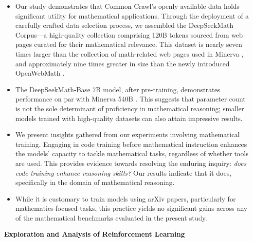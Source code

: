 \begin{itemize}[topsep=0pt]
    \item Our study demonstrates that Common Crawl's openly available data holds significant utility for mathematical applications. Through the deployment of a carefully crafted data selection process, we assembled the DeepSeekMath Corpus—a high-quality collection comprising 120B tokens sourced from web pages curated for their mathematical relevance. This dataset is nearly seven times larger than the collection of math-related web pages used in Minerva \citep{minerva}, and approximately nine times greater in size than the newly introduced OpenWebMath \citep{openwebmath}.

\item The DeepSeekMath-Base 7B model, after pre-training, demonstrates performance on par with Minerva 540B \citep{minerva}. This suggests that parameter count is not the sole determinant of proficiency in mathematical reasoning; smaller models trained with high-quality datasets can also attain impressive results.

\item We present insights gathered from our experiments involving mathematical training. Engaging in code training before mathematical instruction enhances the models’ capacity to tackle mathematical tasks, regardless of whether tools are used. This provides evidence towards resolving the enduring inquiry: \textit{does code training enhance reasoning skills?} Our results indicate that it does, specifically in the domain of mathematical reasoning.

\item While it is customary to train models using arXiv papers, particularly for mathematics-focused tasks, this practice yields no significant gains across any of the mathematical benchmarks evaluated in the present study.
\end{itemize}

\textbf{Exploration and Analysis of Reinforcement Learning}

